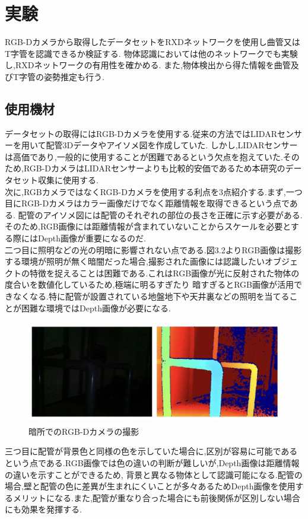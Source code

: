 \chapter{%
実験}

RGB-Dカメラから取得したデータセットをRXDネットワークを使用し曲管又はT字管を認識できるか検証する.
物体認識においては他のネットワークでも実験し,RXDネットワークの有用性を確かめる.
また,物体検出から得た情報を曲管及びT字管の姿勢推定も行う.

\section{使用機材}
データセットの取得にはRGB-Dカメラを使用する.従来の方法ではLIDARセンサーを用いて配管3Dデータやアイソメ図を作成していた.
しかし,LIDARセンサーは高価であり,一般的に使用することが困難であるという欠点を抱えていた.そのため,RGB-DカメラはLIDARセンサーよりも比較的安価であるため本研究のデータセット収集に使用する.\\
次に,RGBカメラではなくRGB-Dカメラを使用する利点を3点紹介する.まず,一つ目にRGB-Dカメラはカラー画像だけでなく距離情報を取得できるという点である.
配管のアイソメ図には配管のそれぞれの部位の長さを正確に示す必要がある.そのため,RGB画像には距離情報が含まれていないことからスケールを必要とする際にはDepth画像が重要になるのだ.\\
二つ目に照明などの光の明暗に影響されない点である.図3.2よりRGB画像は撮影する環境が照明が無く暗闇だった場合,撮影された画像には認識したいオブジェクトの特徴を捉えることは困難である.これはRGB画像が光に反射された物体の度合いを数値化しているため,極端に明るすぎたり
暗すぎるとRGB画像が活用できなくなる.特に配管が設置されている地盤地下や天井裏などの照明を当てることが困難な環境ではDepth画像が必要になる.\\
\begin{figure}[htbt]
    \centering
     \includegraphics[height=45mm]{pipe_rgbd.eps}
     \caption{暗所でのRGB-Dカメラの撮影}
     \label{fig:f2}
\end{figure}
三つ目に配管が背景色と同様の色を示していた場合に,区別が容易に可能であるという点である.RGB画像では色の違いの判断が難しいが,Depth画像は距離情報の違いを示すことができるため,
背景と異なる物体として認識可能になる.配管の場合,壁と配管の色に差異が生まれにくいことが多々あるためDepth画像を使用するメリットになる.また,配管が重なり合った場合にも前後関係が区別しない場合にも効果を発揮する.\\

